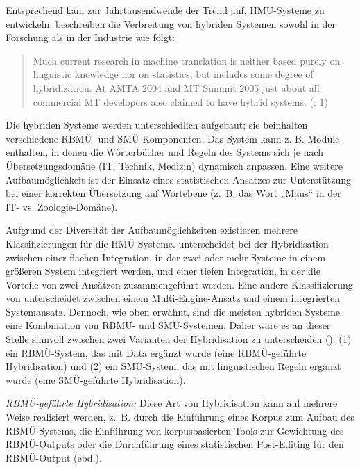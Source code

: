 Entsprechend kam zur Jahrtausendwende der Trend auf, HMÜ-Systeme zu entwickeln. \citet{Cavalli-SforzaLavie2006} beschreiben die Verbreitung von hybriden Systemen sowohl in der Forschung als in der Industrie wie folgt:

\begin{quote}
Much current research in machine translation is neither based purely on linguistic knowledge nor on statistics, but includes some degree of hybridization. At AMTA 2004 and MT Summit 2005 just about all commercial MT developers also claimed to have hybrid systems. (\citealt{Cavalli-SforzaLavie2006}: 1)
\end{quote}

Die hybriden Systeme werden unterschiedlich aufgebaut; sie beinhalten verschiedene RBMÜ- und SMÜ-Komponenten. Das System kann z. B. Module enthalten, in denen die Wörterbücher und Regeln des Systems sich je nach Übersetzungsdomäne (IT, Technik, Medizin) dynamisch anpassen. Eine weitere Aufbaumöglichkeit ist der Einsatz eines statistischen Ansatzes zur Unterstützung bei einer korrekten Übersetzung auf Wortebene (z.~B. das Wort „Maus“ in der IT- vs. Zoologie-Domäne). \citep[171]{Poibeau2017}

Aufgrund der Diversität der Aufbaumöglichkeiten existieren mehrere Klassifizierungen für die HMÜ-Systeme. \citet{Eisele2007} unterscheidet bei der Hybridisation zwischen einer flachen Integration, in der zwei oder mehr Systeme in einem größeren System integriert werden, und einer tiefen Integration, in der die Vorteile von zwei Ansätzen zusammengeführt werden. Eine andere Klassifizierung von \citet{Way2010} unterscheidet zwischen einem Multi-Engine-Ansatz und einem integrierten Systemansatz. Dennoch, wie oben erwähnt, sind die meisten hybriden Systeme eine Kombination von RBMÜ- und SMÜ-Systemen. Daher wäre es an dieser Stelle sinnvoll zwischen zwei Varianten der Hybridisation zu unterscheiden (\citealt{Costa-JussàFonollosa2015}): (1) ein RBMÜ-System, das mit Data ergänzt wurde (eine RBMÜ-geführte Hybridisation) und (2) ein SMÜ-System, das mit linguistischen Regeln ergänzt wurde (eine SMÜ-geführte Hybridisation).

\textit{RBMÜ-geführte Hybridisation:} Diese Art von Hybridisation kann auf mehrere Weise realisiert werden, z.~B. durch die Einführung eines Korpus zum Aufbau des RBMÜ-Systems, die Einführung von korpusbasierten Tools zur Gewichtung des RBMÜ-Outputs oder die Durchführung eines statistischen Post-Editing für den RBMÜ-Output (ebd.).


